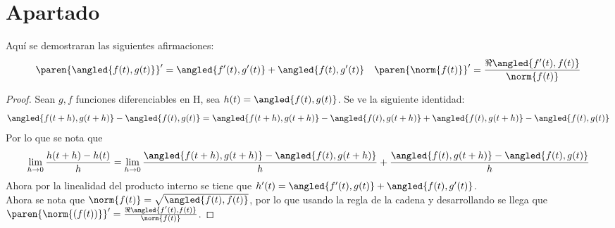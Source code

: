 \documentclass{homework}
\begin{document}
\section*{\hypertarget{apartado}{Apartado}}
Aquí se demostraran las siguientes afirmaciones:
\begin{align*}
    &\paren{\angled{f(t),g(t)}}'=\angled{f'(t),g'(t)} +\angled{f(t),g'(t)} & \paren{\norm{f(t)}}'=\frac{\Re\angled{f'(t),f(t)}}{\norm{f(t)}}
\end{align*}
\begin{proof}
    Sean \(g,f\) funciones diferenciables en H, sea \(h(t)=\angled{f(t),g(t)}\). Se ve la siguiente identidad:
    \begin{equation*}
        {\angled{f(t+h),g(t+h)}-\angled{f(t),g(t)}}={\angled{f(t+h),g(t+h)}-\angled{f(t),g(t+h)}+\angled{f(t),g(t+h)}-\angled{f(t),g(t)}}
    \end{equation*}
    Por lo que se nota que
    \begin{equation*}
        \lim_{h\rightarrow0}\frac{h(t+h)-h(t)}h=\lim_{h\rightarrow0}\frac{\angled{f(t+h),g(t+h)}-\angled{f(t),g(t+h)}}h+\frac{\angled{f(t),g(t+h)}-\angled{f(t),g(t)}}h
    \end{equation*}
    Ahora por la linealidad del producto interno se tiene que \(h'(t)=\angled{f'(t),g(t)}+\angled{f(t),g'(t)}\).\\
    Ahora se nota que \(\norm{f(t)}=\sqrt{\angled{f(t),f(t)}}\), por lo que usando la regla de la cadena y desarrollando se llega que \(\paren{\norm{(f(t))}}'=\frac{\Re\angled{f'(t),f(t)}}{\norm{f(t)}}\).
\end{proof}
\end{document}
